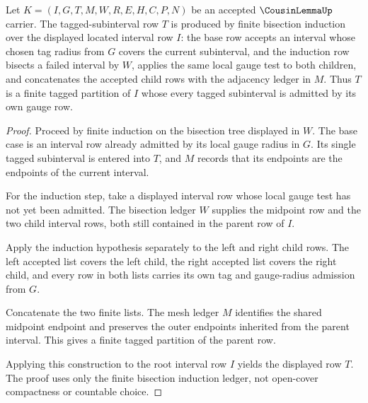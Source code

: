 \begin{theorem}
\label{thm:cousin-lemma-tagged-partition-existence}
Let $K=(I,G,T,M,W,R,E,H,C,P,N)$ be an accepted $\CousinLemmaUp$ carrier. The tagged-subinterval row $T$ is produced by finite bisection induction over the displayed located interval row $I$: the base row accepts an interval whose chosen tag radius from $G$ covers the current subinterval, and the induction row bisects a failed interval by $W$, applies the same local gauge test to both children, and concatenates the accepted child rows with the adjacency ledger in $M$. Thus $T$ is a finite tagged partition of $I$ whose every tagged subinterval is admitted by its own gauge row.
\end{theorem}
\begin{proof}
Proceed by finite induction on the bisection tree displayed in $W$. The base case is an interval row already admitted by its local gauge radius in $G$. Its single tagged subinterval is entered into $T$, and $M$ records that its endpoints are the endpoints of the current interval.

For the induction step, take a displayed interval row whose local gauge test has not yet been admitted. The bisection ledger $W$ supplies the midpoint row and the two child interval rows, both still contained in the parent row of $I$.

Apply the induction hypothesis separately to the left and right child rows. The left accepted list covers the left child, the right accepted list covers the right child, and every row in both lists carries its own tag and gauge-radius admission from $G$.

Concatenate the two finite lists. The mesh ledger $M$ identifies the shared midpoint endpoint and preserves the outer endpoints inherited from the parent interval. This gives a finite tagged partition of the parent row.

Applying this construction to the root interval row $I$ yields the displayed row $T$. The proof uses only the finite bisection induction ledger, not open-cover compactness or countable choice.
\end{proof}

